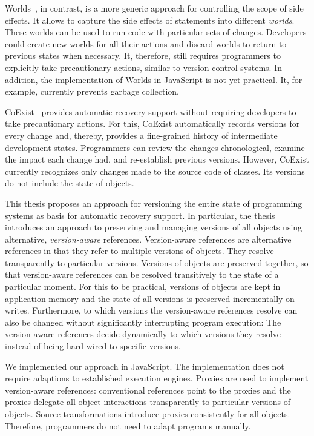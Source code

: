 Worlds~\cite{Warth2011Wor,Warth2009PhD}, in contrast, is a more generic approach for controlling the scope of side effects.
It allows to capture the side effects of statements into different \emph{worlds}.
These worlds can be used to run code with particular sets of changes.
Developers could create new worlds for all their actions and discard worlds to return to previous states when necessary.
It, therefore, still requires programmers to explicitly take precautionary actions, similar to version control systems.
In addition, the implementation of Worlds in JavaScript is not yet practical.
It, for example, currently prevents garbage collection.

CoExist~\cite{Steinert2012COE,Steinert2014EVA} provides automatic recovery support without requiring developers to take precautionary actions.
For this, CoExist automatically records versions for every change and, thereby, provides a fine-grained history of intermediate development states.
Programmers can review the changes chronological, examine the impact each change had, and re-establish previous versions.
However, CoExist currently recognizes only changes made to the source code of classes.
Its versions do not include the state of objects.

This thesis proposes an approach for versioning the entire state of programming systems as basis for automatic recovery support.
In particular, the thesis introduces an approach to preserving and managing versions of all objects using alternative, \emph{version-aware} references.
Version-aware references are alternative references in that they refer to multiple versions of objects.
They resolve transparently to particular versions.
Versions of objects are preserved together, so that version-aware references can be resolved transitively to the state of a particular moment.
For this to be practical, versions of objects are kept in application memory and the state of all versions is preserved incrementally on writes.
Furthermore, to which versions the version-aware references resolve can also be changed without significantly interrupting program execution:
The version-aware references decide dynamically to which versions they resolve instead of being hard-wired to specific versions.

We implemented our approach in JavaScript.
The implementation does not require adaptions to established execution engines.
Proxies are used to implement version-aware references: conventional references point to the proxies and the proxies delegate all object interactions transparently to particular versions of objects.
Source transformations introduce proxies consistently for all objects.
Therefore, programmers do not need to adapt programs manually.


